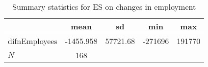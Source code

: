 \begin{table}[htbp]\centering
\def\sym#1{\ifmmode^{#1}\else\(^{#1}\)\fi}
\caption{Summary statistics for ES on changes in employment}
\begin{tabular}{l*{1}{cccc}}
\hline\hline
            &        mean&          sd&         min&         max\\
\hline
difnEmployees&   -1455.958&    57721.68&     -271696&      191770\\
\hline
\(N\)       &         168&            &            &            \\
\hline\hline
\end{tabular}
\end{table}
